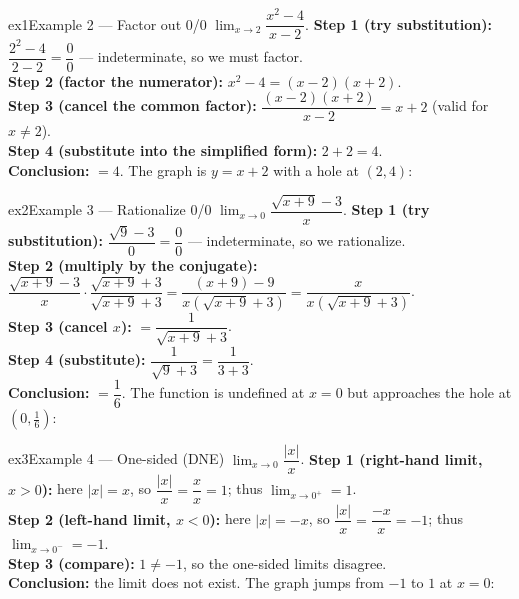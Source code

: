 \documentclass[11pt]{article}
\begin{document}
\begin{example}{ex1}{Example 2 --- Factor out 0/0}
$\displaystyle\lim_{x\to2}\dfrac{x^2-4}{x-2}$.\soln
\textbf{Step 1 (try substitution):} $\dfrac{2^2-4}{2-2}=\dfrac{0}{0}$ --- indeterminate, so we must factor.\\[3pt]
\textbf{Step 2 (factor the numerator):} $x^2-4=(x-2)(x+2)$.\\[3pt]
\textbf{Step 3 (cancel the common factor):} $\dfrac{(x-2)(x+2)}{x-2}=x+2$ (valid for $x\ne2$).\\[3pt]
\textbf{Step 4 (substitute into the simplified form):} $2+2=4$.\\[3pt]
\textbf{Conclusion:} $=4$. The graph is $y=x+2$ with a hole at $(2,4)$:
\end{example}

\begin{example}{ex2}{Example 3 --- Rationalize 0/0}
$\displaystyle\lim_{x\to0}\dfrac{\sqrt{x+9}-3}{x}$.\soln
\textbf{Step 1 (try substitution):} $\dfrac{\sqrt9-3}{0}=\dfrac00$ --- indeterminate, so we rationalize.\\[3pt]
\textbf{Step 2 (multiply by the conjugate):} $\dfrac{\sqrt{x+9}-3}{x}\cdot\dfrac{\sqrt{x+9}+3}{\sqrt{x+9}+3}=\dfrac{(x+9)-9}{x(\sqrt{x+9}+3)}=\dfrac{x}{x(\sqrt{x+9}+3)}$.\\[3pt]
\textbf{Step 3 (cancel $x$):} $=\dfrac{1}{\sqrt{x+9}+3}$.\\[3pt]
\textbf{Step 4 (substitute):} $\dfrac{1}{\sqrt9+3}=\dfrac{1}{3+3}$.\\[3pt]
\textbf{Conclusion:} $=\dfrac16$. The function is undefined at $x=0$ but approaches the hole at $(0,\tfrac16)$:
\end{example}

\begin{example}{ex3}{Example 4 --- One-sided (DNE)}
$\displaystyle\lim_{x\to0}\dfrac{|x|}{x}$.\soln
\textbf{Step 1 (right-hand limit, $x>0$):} here $|x|=x$, so $\dfrac{|x|}{x}=\dfrac{x}{x}=1$; thus $\lim_{x\to0^+}=1$.\\[3pt]
\textbf{Step 2 (left-hand limit, $x<0$):} here $|x|=-x$, so $\dfrac{|x|}{x}=\dfrac{-x}{x}=-1$; thus $\lim_{x\to0^-}=-1$.\\[3pt]
\textbf{Step 3 (compare):} $1\ne-1$, so the one-sided limits disagree.\\[3pt]
\textbf{Conclusion:} the limit does not exist. The graph jumps from $-1$ to $1$ at $x=0$:
\end{example}
\end{document}
